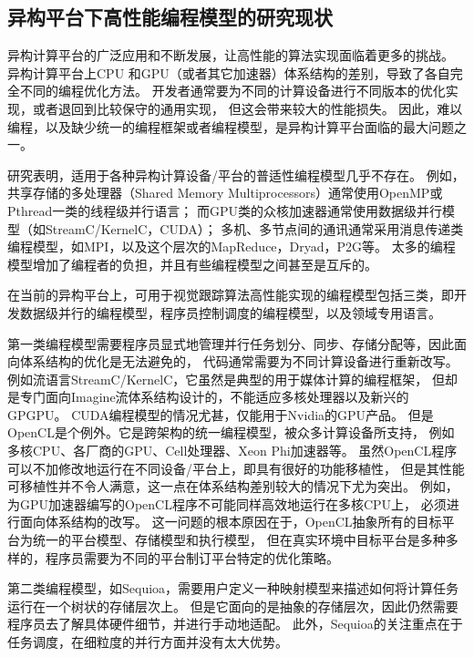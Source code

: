 \subsection{异构平台下高性能编程模型的研究现状}
异构计算平台的广泛应用和不断发展，让高性能的算法实现面临着更多的挑战。
异构计算平台上CPU 和GPU（或者其它加速器）体系结构的差别，导致了各自完全不同的编程优化方法。
开发者通常要为不同的计算设备进行不同版本的优化实现，或者退回到比较保守的通用实现，
但这会带来较大的性能损失。
因此，难以编程，以及缺少统一的编程框架或者编程模型，是异构计算平台面临的最大问题之一。

研究表明，适用于各种异构计算设备/平台的普适性编程模型几乎不存在。
例如，共享存储的多处理器（Shared Memory Multiprocessors）通常使用OpenMP或Pthread一类的线程级并行语言；
而GPU类的众核加速器通常使用数据级并行模型（如StreamC/KernelC，CUDA）；
多机、多节点间的通讯通常采用消息传递类编程模型，如MPI，以及这个层次的MapReduce，Dryad，P2G等。
太多的编程模型增加了编程者的负担，并且有些编程模型之间甚至是互斥的。

在当前的异构平台上，可用于视觉跟踪算法高性能实现的编程模型包括三类，即开发数据级并行的编程模型，程序员控制调度的编程模型，以及领域专用语言。

第一类编程模型需要程序员显式地管理并行任务划分、同步、存储分配等，因此面向体系结构的优化是无法避免的，
代码通常需要为不同计算设备进行重新改写。
例如流语言StreamC/KernelC，它虽然是典型的用于媒体计算的编程框架，
但却是专门面向Imagine流体系结构设计的，不能适应多核处理器以及新兴的GPGPU。
CUDA编程模型的情况尤甚，仅能用于Nvidia的GPU产品。
但是OpenCL是个例外。它是跨架构的统一编程模型，被众多计算设备所支持，
例如多核CPU、各厂商的GPU、Cell处理器、Xeon Phi加速器等。
虽然OpenCL程序可以不加修改地运行在不同设备/平台上，即具有很好的功能移植性，
但是其性能可移植性并不令人满意，这一点在体系结构差别较大的情况下尤为突出。
例如，为GPU加速器编写的OpenCL程序不可能同样高效地运行在多核CPU上，
必须进行面向体系结构的改写。
这一问题的根本原因在于，OpenCL抽象所有的目标平台为统一的平台模型、存储模型和执行模型，
但在真实环境中目标平台是多种多样的，程序员需要为不同的平台制订平台特定的优化策略。

第二类编程模型，如Sequioa，需要用户定义一种映射模型来描述如何将计算任务运行在一个树状的存储层次上。
但是它面向的是抽象的存储层次，因此仍然需要程序员去了解具体硬件细节，并进行手动地适配。
此外，Sequioa的关注重点在于任务调度，在细粒度的并行方面并没有太大优势。

